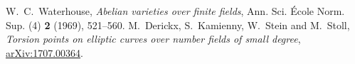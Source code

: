  W.~C.~Waterhouse,
\emph{Abelian varieties over finite fields},
Ann. Sci. \'Ecole Norm. Sup. (4) \textbf{2} (1969), 521--560.
 M.~Derickx, S.~Kamienny, W.~Stein and M.~Stoll,
\emph{Torsion points on elliptic curves over number fields of small degree},
\href{https://arxiv.org/abs/1707.00364}{arXiv:1707.00364}.
